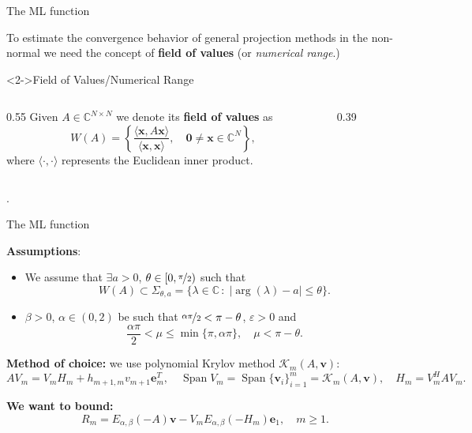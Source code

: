 \documentclass[aspectratio=169,xcolor=dvipsnames]{beamer}
\begin{document}
\begin{frame}{The ML function~\parencite{MoretNovatiML}}

To estimate the convergence behavior of general projection methods in the non-normal we need the concept of \textbf{field of values} (or \emph{numerical range}.)
\begin{block}<2->{Field of Values/Numerical Range}
\begin{columns}
\begin{column}{0.55\columnwidth}
Given $A \in \mathbb{C}^{N \times N}$ we denote its \textbf{field of values} as
\[
W(A) = \left\lbrace \frac{\langle \mathbf{x},A\mathbf{x}\rangle}{\langle\mathbf{x},\mathbf{x}\rangle}, \quad \mathbf{0} \neq \mathbf{x} \in \mathbb{C}^N \right\rbrace,
\]
where $\langle\cdot,\cdot\rangle$ represents the Euclidean inner product.
\end{column}
\begin{column}{0.39\columnwidth}
\centering


\end{column}
\end{columns}
\end{block}

.
\end{frame}

\begin{frame}{The ML function~\parencite{MoretNovatiML}}

\textbf{Assumptions}:
\begin{itemize}
	\item[(A1)] We assume that $\exists a > 0$, $\theta \in [0,\nicefrac{\pi}{2})$ such that
	\[W(A) \subset \Sigma_{\theta,a} = \{ \lambda \in \mathbb{C}\,:\; |\arg(\lambda) - a| \leq \theta \}.\]
	\item[(A2)] $\beta > 0$, $\alpha \in (0,2)$ be such that $\nicefrac{\alpha \pi}{2} < \pi - \theta$, $\varepsilon > 0$ and
	\[
		\frac{\alpha \pi}{2} < \mu \leq \min\{\pi,\alpha\pi\}, \quad \mu < \pi - \theta.
	\]
\end{itemize}

\textbf{Method of choice:} we use \alert{polynomial Krylov method} $\mathcal{K}_m(A,\mathbf{v})$:
\[
A V_m = V_m H_m + h_{m+1,m} v_{m+1} \mathbf{e}_m^T, \quad \operatorname{Span} V_m = \operatorname{Span}\{\mathbf{v}_i\}_{i=1}^m = \mathcal{K}_m(A,\textbf{v}), \quad H_m = V_m^H A V_m.
\]

\textbf{We want to bound:}
\[
R_m = E_{\alpha,\beta}(-A)\mathbf{v} - V_m E_{\alpha,\beta}(-H_m)\mathbf{e}_1, \quad m \geq 1.
\]

\end{frame}
\end{document}
